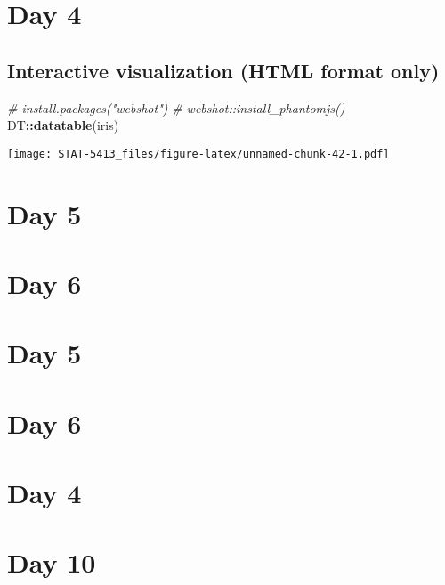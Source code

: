 \documentclass[]{book}
\newenvironment{Shaded}{\begin{snugshade}}{\end{snugshade}}
\newcommand{\CommentTok}[1]{\textcolor[rgb]{0.56,0.35,0.01}{\textit{#1}}}
\newcommand{\KeywordTok}[1]{\textcolor[rgb]{0.13,0.29,0.53}{\textbf{#1}}}
\newcommand{\NormalTok}[1]{#1}
\newcommand{\OperatorTok}[1]{\textcolor[rgb]{0.81,0.36,0.00}{\textbf{#1}}}
\begin{document}
\hypertarget{day-4}{%
\chapter{Day 4}\label{day-4}}

\hypertarget{interactive-visualization-html-format-only}{%
\section{Interactive visualization (HTML format only)}\label{interactive-visualization-html-format-only}}

\begin{Shaded}
\begin{Highlighting}[]
\CommentTok{# install.packages("webshot")}
\CommentTok{# webshot::install_phantomjs()}
\NormalTok{DT}\OperatorTok{::}\KeywordTok{datatable}\NormalTok{(iris)}
\end{Highlighting}
\end{Shaded}

\texttt{[image: STAT-5413\_files/figure-latex/unnamed-chunk-42-1.pdf]}

\hypertarget{day-5}{%
\chapter{Day 5}\label{day-5}}

\hypertarget{day-6}{%
\chapter{Day 6}\label{day-6}}

\hypertarget{day-5-1}{%
\chapter{Day 5}\label{day-5-1}}

\hypertarget{day-6-1}{%
\chapter{Day 6}\label{day-6-1}}

\hypertarget{day-4-1}{%
\chapter{Day 4}\label{day-4-1}}

\hypertarget{day-10}{%
\chapter{Day 10}\label{day-10}}
\end{document}

